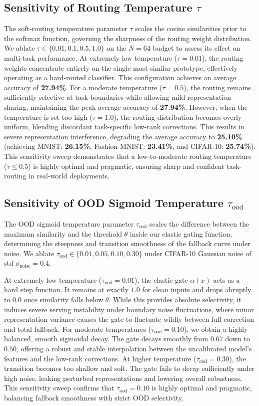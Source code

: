 \documentclass{article}
\theoremstyle{plain}
\theoremstyle{definition}
\theoremstyle{remark}
\begin{document}
\subsection{Sensitivity of Routing Temperature $\tau$}
The soft-routing temperature parameter $\tau$ scales the cosine similarities prior to the softmax function, governing the sharpness of the routing weight distribution. We ablate $\tau \in \{0.01, 0.1, 0.5, 1.0\}$ on the $N=64$ budget to assess its effect on multi-task performance.
At extremely low temperature ($\tau = 0.01$), the routing weights concentrate entirely on the single most similar prototype, effectively operating as a hard-routed classifier. This configuration achieves an average accuracy of \textbf{27.94\%}.
For a moderate temperature ($\tau = 0.5$), the routing remains sufficiently selective at task boundaries while allowing mild representation sharing, maintaining the peak average accuracy of \textbf{27.94\%}.
However, when the temperature is set too high ($\tau = 1.0$), the routing distribution becomes overly uniform, blending discordant task-specific low-rank corrections. This results in severe representation interference, degrading the average accuracy to \textbf{25.10\%} (achieving MNIST: \textbf{26.15\%}, Fashion-MNIST: \textbf{23.41\%}, and CIFAR-10: \textbf{25.74\%}).
This sensitivity sweep demonstrates that a low-to-moderate routing temperature ($\tau \le 0.5$) is highly optimal and pragmatic, ensuring sharp and confident task-routing in real-world deployments.

\subsection{Sensitivity of OOD Sigmoid Temperature $\tau_{\text{ood}}$}
The OOD sigmoid temperature parameter $\tau_{\text{ood}}$ scales the difference between the maximum similarity and the threshold $\theta$ inside our elastic gating function, determining the steepness and transition smoothness of the fallback curve under noise. We ablate $\tau_{\text{ood}} \in \{0.01, 0.05, 0.10, 0.30\}$ under CIFAR-10 Gaussian noise of std $\sigma_{\text{noise}} = 0.4$.

At extremely low temperature ($\tau_{\text{ood}} = 0.01$), the elastic gate $\alpha(x)$ acts as a hard step function. It remains at exactly $1.0$ for clean inputs and drops abruptly to $0.0$ once similarity falls below $\theta$. While this provides absolute selectivity, it induces severe serving instability under boundary noise fluctuations, where minor representation variance causes the gate to fluctuate wildly between full correction and total fallback.
For moderate temperatures ($\tau_{\text{ood}} = 0.10$), we obtain a highly balanced, smooth sigmoidal decay. The gate decays smoothly from $0.67$ down to $0.50$, offering a robust and stable interpolation between the uncalibrated model's features and the low-rank corrections.
At higher temperature ($\tau_{\text{ood}} = 0.30$), the transition becomes too shallow and soft. The gate fails to decay sufficiently under high noise, leaking perturbed representations and lowering overall robustness.
This sensitivity sweep confirms that $\tau_{\text{ood}} = 0.10$ is highly optimal and pragmatic, balancing fallback smoothness with strict OOD selectivity.
\end{document}
